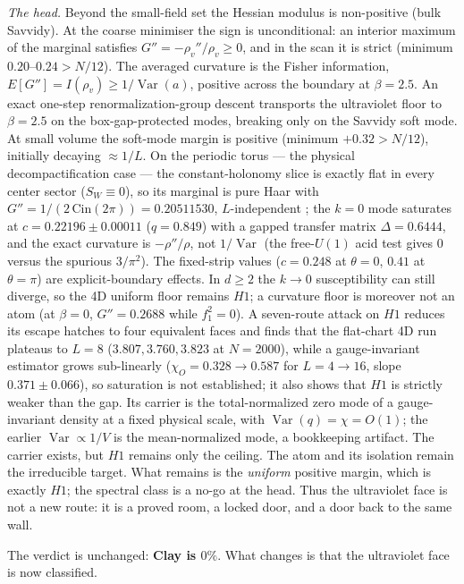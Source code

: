 \documentclass[11pt,a4paper]{article}
\newcommand{\labb}[2]{\fcolorbox{#1!35}{#1!8}{\textcolor{#1}{\textbf{\scriptsize #2}}}}
\newcommand{\LT}{\labb{cT}{T}}
\begin{document}
\begin{tcolorbox}[enhanced, breakable, colback=white, colframe=white, boxrule=0pt,
  left=6pt, right=6pt, top=4pt, bottom=4pt, parbox=false]
\emph{The head.} Beyond the small-field set the Hessian modulus is non-positive (bulk Savvidy). At
the coarse minimiser the sign is unconditional: an interior maximum of the marginal satisfies
$G''=-\rho_v''/\rho_v\ge0$, and in the scan it is strict (minimum $0.20$--$0.24>N/12$). The
averaged curvature is the Fisher information, $E[G'']=I(\rho_v)\ge1/\operatorname{Var}(a)$, positive
across the boundary at $\beta=2.5$. An exact one-step renormalization-group descent transports the
ultraviolet floor to $\beta=2.5$ on the box-gap-protected modes, breaking only on the Savvidy soft
mode. At small volume the soft-mode margin is positive (minimum $+0.32>N/12$), initially decaying
$\approx1/L$. On the periodic torus — the physical decompactification case — the constant-holonomy
slice is exactly flat in every center sector ($S_W\equiv0$), so its marginal is pure Haar with
$G''=1/(2\,\mathrm{Cin}(2\pi))=0.20511530$, $L$-independent \LT; the $k=0$ mode saturates at
$c=0.22196\pm0.00011$ ($q=0.849$) with a gapped transfer matrix $\Delta=0.6444$, and the exact
curvature is $-\rho''/\rho$, not $1/\operatorname{Var}$ (the free-$U(1)$ acid test gives $0$ versus the
spurious $3/\pi^2$). The fixed-strip values ($c=0.248$ at $\theta=0$, $0.41$ at $\theta=\pi$) are
explicit-boundary effects. In $d\ge2$ the $k\to0$ susceptibility can still diverge, so the 4D uniform
floor remains $H1$; a curvature floor is moreover not an atom (at $\beta=0$, $G''=0.2688$ while
$f_1^2=0$). A seven-route attack on $H1$ reduces its escape hatches to four equivalent faces and
finds that the flat-chart 4D run plateaus to $L=8$ ($3.807,3.760,3.823$ at $N=2000$), while a
gauge-invariant estimator grows sub-linearly ($\chi_O=0.328\to0.587$ for $L=4\to16$, slope
$0.371\pm0.066$), so saturation is not established; it also shows that $H1$ is strictly weaker than
the gap. Its carrier is
the total-normalized zero mode of a gauge-invariant density at a fixed physical scale, with
$\operatorname{Var}(q)=\chi=O(1)$; the earlier $\operatorname{Var}\propto1/V$ is the mean-normalized
mode, a bookkeeping artifact. The carrier exists, but $H1$ remains only the ceiling. The atom and its
isolation remain the irreducible target. What remains is the \emph{uniform} positive margin,
which is exactly $H1$; the spectral class is a no-go at the head. Thus the ultraviolet face is not a new route: it is a proved room, a locked door, and a
door back to the same wall.

The verdict is unchanged: \textbf{Clay is $0\%$}. What changes is that the ultraviolet face is now
classified.
\end{tcolorbox}
\end{document}

